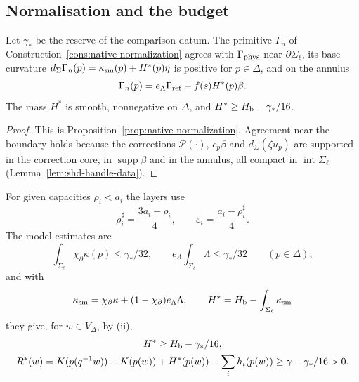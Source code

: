 \subsection{Normalisation and the budget}\label{sec:shd-datum}

\begin{lemma}\label{lem:shd-datum}
Let $\gamma_*$ be the reserve of the comparison datum. The primitive $\Gamma_n$ of
Construction~\ref{cons:native-normalization} agrees with $\Gamma_{\rm phys}$ near $\partial\Sigma_\ell$, its base curvature
$d_\Sigma\Gamma_n(p)=\kappa_{\rm sm}(p)+H^*(p)\eta$ is positive for $p\in\Delta$, and on the annulus
\begin{equation}\label{eq:shd-Gamma}
 \Gamma_n(p)=e_\Lambda\Gamma_{\rm ref}+f(s)H^*(p)\beta .
\end{equation}
The mass $H^*$ is smooth, nonnegative on $\Delta$, and $H^*\ge H_{\mathrm b}-\gamma_*/16$.
\end{lemma}
\begin{proof}
This is Proposition~\ref{prop:native-normalization}. Agreement near the boundary holds because the corrections
$\mathcal P(\cdot)$, $c_p\beta$ and $d_\Sigma(\zeta u_p)$ are supported in the correction core, in $\operatorname{supp}\beta$ and in the
annulus, all compact in $\operatorname{int}\Sigma_\ell$ (Lemma~\ref{lem:shd-handle-data}).
\end{proof}

For given capacities $\rho_i<a_i$ the layers use
\begin{equation}\label{eq:shd-constants}
 \rho_i^\sharp=\frac{3a_i+\rho_i}{4},\qquad
 \varepsilon_i=\frac{a_i-\rho_i^\sharp}{4}.
\end{equation}
The model estimates are
\begin{equation}\label{eq:shd-collar}
 \int_{\Sigma_\ell}\chi_\partial\kappa(p)\le\gamma_*/32,\qquad
 e_\Lambda\int_{\Sigma_\ell}\Lambda\le\gamma_*/32\qquad(p\in\Delta),
\end{equation}
and with
\begin{equation}\label{eq:shd-ksm}
 \kappa_{\rm sm}=\chi_\partial\kappa+(1-\chi_\partial)e_\Lambda\Lambda,
 \qquad H^*=H_{\mathrm b}-\int_{\Sigma_\ell}\kappa_{\rm sm}
\end{equation}
they give, for $w\in V_\Delta$, by (ii),
\begin{multline}\label{eq:shd-budget}
 H^*\ge H_{\mathrm b}-\gamma_*/16,\\
 R^*(w)=K(p(q^{-1}w))-K(p(w))+H^*(p(w))-\sum_ih_i(p(w))\ge\gamma-\gamma_*/16>0 .
\end{multline}

